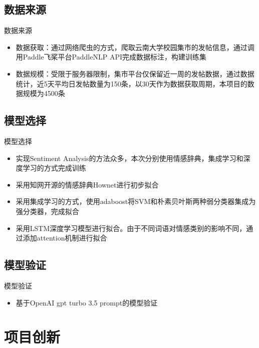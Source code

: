 \documentclass[UTF8]{ctexbeamer}
\begin{document}
\subsection{数据来源}
\begin{frame}{数据来源}
  \begin{itemize}
  \item {
    数据获取：通过网络爬虫的方式，爬取云南大学校园集市的发帖信息，通过调用Paddle飞桨平台PaddleNLP API完成数据标注，构建训练集
  }
  \item {
    数据规模：受限于服务器限制，集市平台仅保留近一周的发帖数据，通过数据统计，近5天平均日发帖数量为150条，以30天作为数据获取周期，本项目的数据规模为4500条
  }
  \end{itemize}
\end{frame}

\subsection{模型选择}

\begin{frame}{模型选择}
   \begin{itemize}
  \item {
    实现Sentiment Analysis的方法众多，本次分别使用情感辞典，集成学习和深度学习的方式完成训练
  }
  \item {
    采用知网开源的情感辞典Hownet进行初步拟合
  }
  \item {
    采用集成学习的方式，使用adaboost将SVM和朴素贝叶斯两种弱分类器集成为强分类器，完成拟合
  }
  \item {
   采用LSTM深度学习模型进行拟合。由于不同词语对情感类别的影响不同，通过添加attention机制进行拟合
  }
  \end{itemize}
\end{frame}

\subsection{模型验证}
\begin{frame}{模型验证}
  \begin{itemize}
  \item {
    基于OpenAI gpt turbo 3.5 prompt的模型验证
  }
  \end{itemize}
\end{frame}




\section{项目创新}
\end{document}
